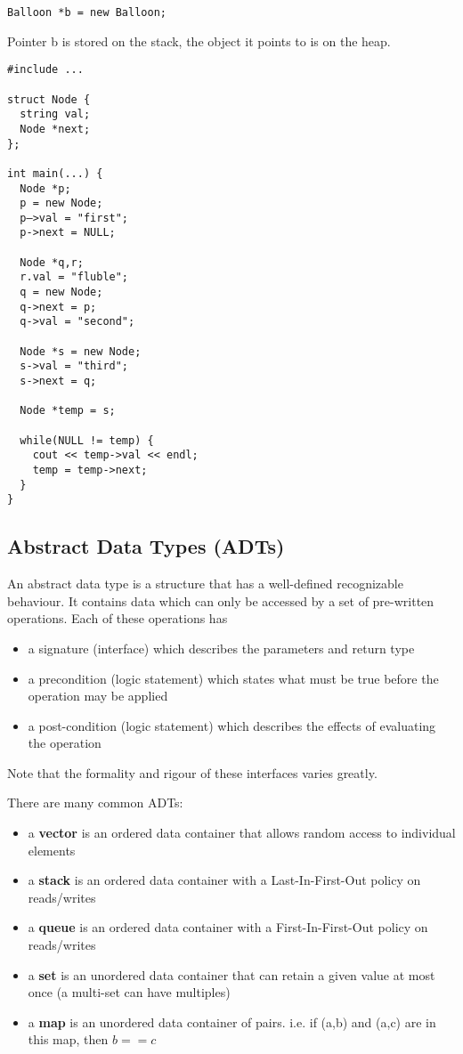 \documentclass[12pt]{article}
\begin{document}
\begin{verbatim}
Balloon *b = new Balloon;
\end{verbatim}
Pointer b is stored on the stack, the object it points to is on the heap.

\begin{verbatim}
#include ...

struct Node {
  string val;
  Node *next;
};

int main(...) {
  Node *p;
  p = new Node;
  p—>val = "first";
  p->next = NULL;

  Node *q,r;
  r.val = "fluble";
  q = new Node;
  q->next = p;
  q->val = "second";

  Node *s = new Node;
  s->val = "third";
  s->next = q;

  Node *temp = s;

  while(NULL != temp) {
    cout << temp->val << endl;
    temp = temp->next;
  }
}
\end{verbatim}

\subsection*{Abstract Data Types (ADTs)}
An abstract data type is a structure that has a well-defined recognizable behaviour. It contains data which can only be accessed by a set of pre-written operations. Each of these operations has
\begin{itemize}
\item a signature (interface) which describes the parameters and return type
\item a precondition (logic statement) which states what must be true before the operation may be applied
\item a post-condition (logic statement) which describes the effects of evaluating the operation
\end{itemize}
Note that the formality and rigour of these interfaces varies greatly.

There are many common ADTs:
\begin{itemize}
\item a {\bf vector} is an ordered data container that allows random access to individual elements
\item a {\bf stack} is an ordered data container with a Last-In-First-Out policy on reads/writes
\item a {\bf queue} is an ordered data container with a First-In-First-Out policy on reads/writes
\item a {\bf set} is an unordered data container that can retain a given value at most once (a multi-set can have multiples)
\item a {\bf map} is an unordered data container of pairs. i.e. if (a,b) and (a,c) are in this map, then $b == c$
\end{itemize}
\end{document}
